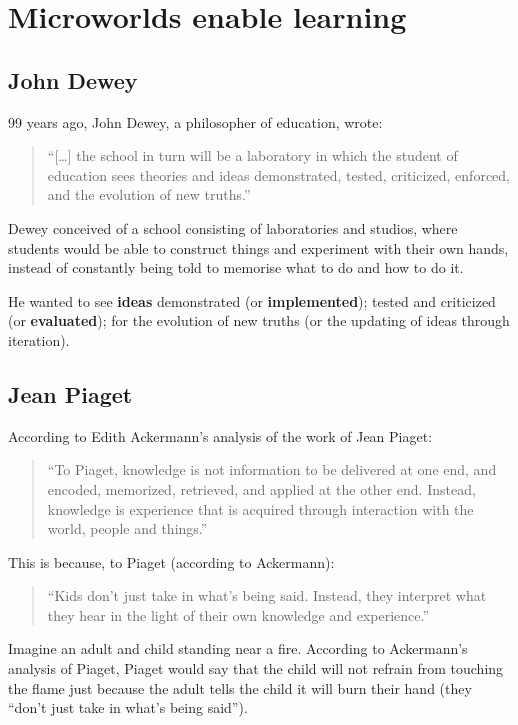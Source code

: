 \section{Microworlds enable learning}

\subsection{John Dewey}

99 years ago, John Dewey, a philosopher of education, wrote:

\begin{quote}
``{[}\ldots{}{]} the school in turn will be a laboratory in which the
student of education sees theories and ideas demonstrated, tested,
criticized, enforced, and the evolution of new truths.''\cite[p55]{dewey}
\end{quote}

Dewey conceived of a school consisting of laboratories and studios,
where students would be able to construct things and experiment with
their own hands, instead of constantly being told to memorise what to do
and how to do it.

He wanted to see \textbf{ideas} demonstrated (or \textbf{implemented});
tested and criticized (or \textbf{evaluated}); for the evolution of new
truths (or the updating of ideas through iteration).

\subsection{Jean Piaget}

According to Edith Ackermann's analysis of the work of Jean Piaget:

\begin{quote}
``To Piaget, knowledge is not information to be delivered at one end, and
encoded, memorized, retrieved, and applied at the other end. Instead,
knowledge is experience that is acquired through interaction with the
world, people and things.''\cite{ackermann}
\end{quote}

This is because, to Piaget (according to Ackermann):

\begin{quote}
``Kids don't just take in what's being said. Instead, they interpret what
they hear in the light of their own knowledge and experience.''\cite{ackermann}
\end{quote}

Imagine an adult and child standing near a fire. According to
Ackermann's analysis of Piaget, Piaget would say that the child will not
refrain from touching the flame just because the adult tells the child
it will burn their hand (they ``don't just take in what's being said'').

